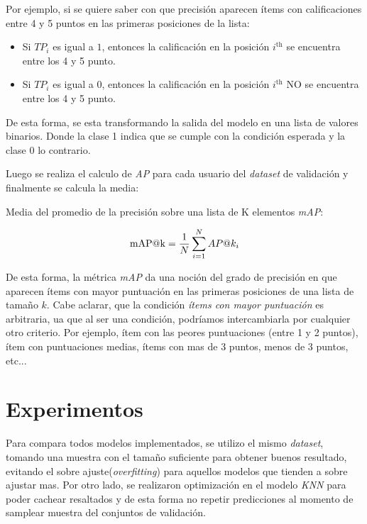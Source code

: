 \documentclass[11pt,a4paper,twoside]{thesis}
\begin{document}
Por ejemplo, si se quiere saber con que precisión aparecen ítems con
calificaciones entre 4 y 5 puntos en las primeras posiciones de la lista:

\begin{itemize}
	\item Si $TP_i$ es igual a $1$, entonces la calificación en la posición
	      $i^\mathrm{th}$ se encuentra entre los 4 y 5 punto.
	\item Si $TP_i$ es igual a $0$, entonces la calificación en la posición
	      $i^\mathrm{th}$ NO se encuentra entre los 4 y 5 punto.
\end{itemize}

De esta forma, se esta transformando la salida del modelo en una lista de
valores binarios. Donde la clase 1 indica que se cumple con la condición
esperada y la clase 0 lo contrario.

Luego se realiza el calculo de \textit{AP\makeatletter@k} para cada usuario del
\textit{dataset} de validación y finalmente se calcula la media:

\begin{description}
	\item[Media del promedio de la precisión sobre una lista de K elementos
	\textit{mAP\makeatletter@k}:]
\end{description}
\begin{equation}
	\operatorname{mAP\makeatletter@k}=\frac{1}{N} \sum_{i=1}^N AP\makeatletter@k_i
\end{equation}

De esta forma, la métrica \textit{mAP\makeatletter@k} da una noción del grado
de precisión en que aparecen ítems con mayor puntuación en las primeras
posiciones de una lista de tamaño $k$. Cabe aclarar, que la condición
\textit{ítems con mayor puntuación} es arbitraria, ua que al ser una condición,
podríamos intercambiarla por cualquier otro criterio. Por ejemplo, ítem con las
peores puntuaciones (entre 1 y 2 puntos), ítem con puntuaciones medias, ítems
con mas de 3 puntos, menos de 3 puntos, etc...

\chapter{Experimentos}

Para compara todos modelos implementados, se utilizo el mismo \textit{dataset},
tomando una muestra con el tamaño suficiente para obtener buenos resultado,
evitando el sobre ajuste(\textit{overfitting}) para aquellos modelos que
tienden a sobre ajustar mas. Por otro lado, se realizaron optimización en el
modelo \textit{KNN} para poder cachear resaltados y de esta forma no repetir
predicciones al momento de samplear muestra del conjuntos de validación.
\end{document}
